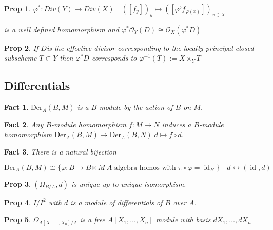 \documentclass[a4paper, 12pt]{article}
\newcommand{\ox}{\mathcal{O}_X}
\newcommand{\oy}{\mathcal{O}_Y}
\newtheorem*{prop}{Prop}
\newtheorem*{fact}{Fact}
\DeclareMathOperator{\id}{id}
\begin{document}
	\begin{prop}
		$ \varphi^*: Div(Y) \rightarrow Div(X) \quad ([f_y])_y \mapsto ([\varphi^{\flat}f_{\varphi(x)}])_{x \in X} $
		
		is a well defined homomorphism and $ \varphi^* \oy(D) \cong \ox(\varphi ^* D) $
	\end{prop}
	
	\begin{prop}
		If $ D $is the effective divisor corresponding to the locally principal closed subscheme $ T \subset Y $ then $ \varphi^* D $ corresponds to $  \varphi^{-1} (T) := X\times_Y T$
	\end{prop}
	
	
	
	\subsection{Differentials}
	
	\begin{fact}
		$ \mathrm{Der}_A(B,M) $ is a $ B $-module by the action of $ B $ on $ M $.
	\end{fact}
	
	\begin{fact}
		Any $ B $-module homomorphism $ f:M \rightarrow N $ induces a $ B $-module homomorphism $ \mathrm{Der}_A(B,M) \rightarrow \mathrm{Der}_A(B,N) \; d \mapsto f \circ d $.
	\end{fact}
	
	\begin{fact}
		There is a natural bijection
		
		 $ \mathrm{Der}_A(B,M) \cong \{ \varphi : B \rightarrow B \ltimes M \: A\text{-algebra homos with } \pi \circ \varphi = \id_B \}  \quad d \leftrightarrow (\id , d) $
	\end{fact}
	
	\begin{prop}
		$ (\Omega_{B/A}, d ) $ is unique up to unique isomorphism.
	\end{prop}
	
	\begin{prop}
		$ I/I^2 $ with $ d $  is a module of differentials of $ B $ over $ A $.
	\end{prop}
	
	\begin{prop}
		$ \Omega_{A[X_1, \dots , X_n]/A} $ is a free $ A[X_1, \dots , X_n] $ module with basis $ d X_1 , \dots , d X_n $
	\end{prop}
	
\end{document}
